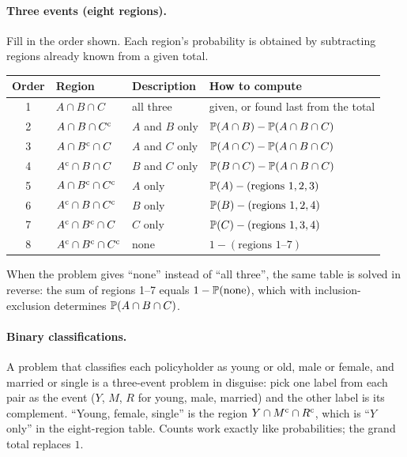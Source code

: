 \paragraph{Three events (eight regions).}
Fill in the order shown. Each region's probability is obtained by subtracting
regions already known from a given total.
\begin{center}
\begin{tabular}{@{}clll@{}}
\toprule
Order & Region & Description & How to compute \\
\midrule
1 & $A \cap B \cap C$                   & all three          & given, or found last from the total \\
2 & $A \cap B \cap C^{\mathrm{c}}$              & $A$ and $B$ only   & $\mathbb{P}(A\cap B) - \mathbb{P}(A\cap B\cap C)$ \\
3 & $A \cap B^{\mathrm{c}} \cap C$              & $A$ and $C$ only   & $\mathbb{P}(A\cap C) - \mathbb{P}(A\cap B\cap C)$ \\
4 & $A^{\mathrm{c}} \cap B \cap C$              & $B$ and $C$ only   & $\mathbb{P}(B\cap C) - \mathbb{P}(A\cap B\cap C)$ \\
5 & $A \cap B^{\mathrm{c}} \cap C^{\mathrm{c}}$         & $A$ only           & $\mathbb{P}(A) - (\text{regions } 1,2,3)$ \\
6 & $A^{\mathrm{c}} \cap B \cap C^{\mathrm{c}}$         & $B$ only           & $\mathbb{P}(B) - (\text{regions } 1,2,4)$ \\
7 & $A^{\mathrm{c}} \cap B^{\mathrm{c}} \cap C$         & $C$ only           & $\mathbb{P}(C) - (\text{regions } 1,3,4)$ \\
8 & $A^{\mathrm{c}} \cap B^{\mathrm{c}} \cap C^{\mathrm{c}}$    & none               & $1 - (\text{regions } 1\text{--}7)$ \\
\bottomrule
\end{tabular}
\end{center}
When the problem gives ``none'' instead of ``all three'', the same table is solved
in reverse: the sum of regions 1--7 equals $1 - \mathbb{P}(\text{none})$, which with
inclusion-exclusion determines $\mathbb{P}(A \cap B \cap C)$.

\paragraph{Binary classifications.}
A problem that classifies each policyholder as young or old, male or female, and
married or single is a three-event problem in disguise: pick one label from each
pair as the event ($Y$, $M$, $R$ for young, male, married) and the other label is its
complement. ``Young, female, single'' is the region $Y \cap M^{\mathrm{c}} \cap R^{\mathrm{c}}$,
which is ``$Y$ only'' in the eight-region table. Counts work exactly like
probabilities; the grand total replaces $1$.

